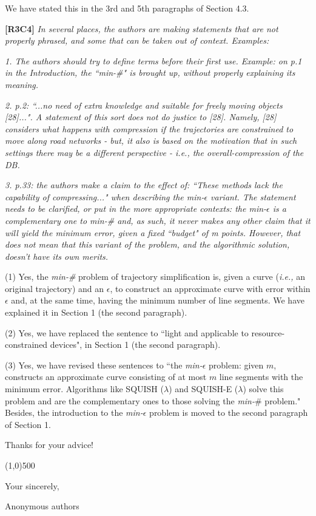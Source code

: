 \documentclass{letter}
\newcommand{\ie}{\emph{i.e.,}\xspace}
\begin{document}
We have stated this in the 3rd and 5th paragraphs of Section 4.3. 

\textbf{[R3C4]} \emph{
In several places, the authors are making statements that are not properly phrased, and some that can be taken out of context. Examples:}

\emph{1. The authors should try to define terms before their first use. Example: on p.1 in the Introduction, the ``min-\#" is brought up, without properly explaining its meaning.}


\emph{2. p.2: ``...no need of extra knowledge and suitable for freely moving objects [28]...". A statement of this sort does not do justice to [28].
Namely, [28] considers what happens with compression if the trajectories are constrained to move along road networks - but, it also is based on the motivation that in such settings there may be a different perspective - i.e., the overall-compression of the DB.}


\emph{3. p.33: the authors make a claim to the effect of: ``These methods lack the capability of compressing..." when describing the min-$\epsilon$ variant. The statement needs to be clarified, or put in the more appropriate contexts: the min-$\epsilon$  is a complementary one to min-\# and, as such, it never makes any other claim that it will yield the minimum error, given a fixed ``budget" of m points. However, that does not mean that this variant of the problem, and the algorithmic solution, doesn't have its own merits.}



(1) Yes, the \emph{min-\#} problem of trajectory simplification is, given a curve (\ie an original trajectory) and an $\epsilon$, to construct an approximate curve with error within $\epsilon$ and, at the same time, having the minimum number of line segments. We have explained it in Section 1 (the second paragraph). 

(2) Yes, we have replaced the sentence to ``light and applicable to resource-constrained devices", in Section 1 (the second paragraph). 

(3) Yes, we have revised these sentences to ``the \emph{min-$\epsilon$} problem: given $m$, constructs an approximate curve consisting of at most $m$ line segments with the minimum error. Algorithms like SQUISH ($\lambda$) and SQUISH-E ($\lambda$) solve this problem and are the complementary ones to those solving the \emph{min-$\#$} problem." Besides, the introduction to the \emph{min-$\epsilon$} problem is moved to the second paragraph of Section 1.

Thanks for your advice!

\line(1,0){500}



Your sincerely,

Anonymous authors

%
%
\end{document}
